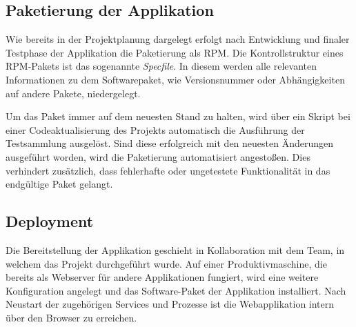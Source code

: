 \subsection{Paketierung der Applikation}
\label{sec:Paketierung der Applikation}
Wie bereits in der Projektplanung dargelegt erfolgt nach Entwicklung und finaler Testphase der
Applikation die Paketierung als RPM. Die Kontrollstruktur eines RPM-Pakets ist das sogenannte
\textit{Specfile}. In diesem werden alle relevanten Informationen zu dem Softwarepaket,
wie \bspw Versionsnummer oder Abhängigkeiten auf andere Pakete, niedergelegt.

Um das Paket immer auf dem neuesten Stand zu halten, wird über ein Skript bei einer
Codeaktualisierung des Projekts automatisch die Ausführung der Testsammlung ausgelöst.
Sind diese erfolgreich mit den neuesten Änderungen ausgeführt worden, wird die Paketierung
automatisiert angestoßen. Dies verhindert zusätzlich, dass fehlerhafte
oder ungetestete Funktionalität in das endgültige Paket gelangt.

\subsection{Deployment}
\label{sec:Deployment}
Die Bereitstellung der Applikation geschieht in Kollaboration mit dem Team, in welchem das
Projekt durchgeführt wurde. Auf einer Produktivmaschine, die bereits als Webserver für
andere Applikationen fungiert, wird eine weitere Konfiguration angelegt und das Software-Paket der
Applikation installiert. Nach Neustart der zugehörigen Services und Prozesse ist die
Webapplikation intern über den Browser zu erreichen.
\pagebreak
